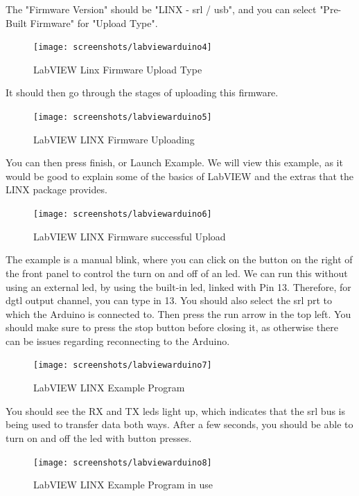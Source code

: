 \documentclass[a4paper,11pt]{report}
\begin{document}
The "Firmware Version" should be "LINX - \gls{srl} / \gls{usb}", and you can select "Pre-Built Firmware" for "Upload Type".

\begin{figure}[H]
\centering
\texttt{[image: screenshots/labviewarduino4]}
\caption{LabVIEW Linx Firmware Upload Type}
\end{figure}

It should then go through the stages of uploading this firmware.

\begin{figure}[H]
\centering
\texttt{[image: screenshots/labviewarduino5]}
\caption{LabVIEW LINX Firmware Uploading}
\end{figure}

You can then press finish, or Launch Example. We will view this example, as it would be good to explain some of the basics of LabVIEW and the extras that the LINX package provides.

\begin{figure}[H]
\centering
\texttt{[image: screenshots/labviewarduino6]}
\caption{LabVIEW LINX Firmware successful Upload}
\end{figure}

The example is a manual blink, where you can click on the button on the right of the front panel to control the turn on and off of an \gls{led}. We can run this without using an external \gls{led}, by using the built-in \gls{led}, linked with Pin 13. Therefore, for \gls{dgtl} output channel, you can type in 13. You should also select the \gls{srl} \gls{prt} to which the Arduino is connected to. Then press the run arrow in the top left. You should make sure to press the stop button before closing it, as otherwise there can be issues regarding reconnecting to the Arduino.

\begin{figure}[H]
\centering
\texttt{[image: screenshots/labviewarduino7]}
\caption{LabVIEW LINX Example Program}
\end{figure}

You should see the RX and TX \gls{led}s light up, which indicates that the \gls{srl} bus is being used to transfer data both ways. After a few seconds, you should be able to turn on and off the \gls{led} with button presses.

\begin{figure}[H]
\centering
\texttt{[image: screenshots/labviewarduino8]}
\caption{LabVIEW LINX Example Program in use}
\end{figure}
\end{document}
